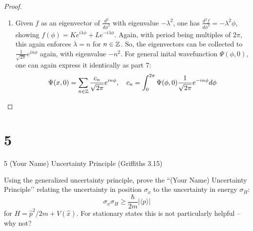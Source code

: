 \documentclass{article}
\begin{document}
\begin{proof}
\begin{enumerate}
        \item Given $f$ as an eigenvector of $\frac{d^2}{d\phi^2}$ with eigenvalue $-\lambda^2$, one has $\frac{d^2f}{d\phi^2}=-\lambda^2\phi$, showing $f(\phi) = Ke^{i\lambda\phi} + Le^{-i\lambda\phi}$. Again, with period being multiples of $2\pi$, this again enforces $\lambda = n$ for $n\in\mathbb{Z}$. So, the eigenvectors can be collected to $\frac{1}{\sqrt{2\pi}}e^{in\phi}$ again, with eigenvalue $-n^2$. For general inital wavefunction $\Psi(\phi,0)$, one can again express it identically as part 7:
        \begin{align}
            \Psi(x,0) = \sum_{n\in\mathbb{Z}}\frac{c_n}{\sqrt{2\pi}}e^{in\phi}, \quad c_n = \int_{0}^{2\pi}\Psi(\phi,0)\frac{1}{\sqrt{2\pi}}e^{-in\phi}d\phi
        \end{align}
    \end{enumerate}
\end{proof}

\newpage

\section*{5}
\begin{ques}\label{q5}
5 (Your Name) Uncertainty Principle (Griffiths 3.15)

Using the generalized uncertainty principle, prove the “(Your Name) Uncertainty Principle’’ relating the uncertainty in position $\sigma_x$ to the uncertainty in energy $\sigma_H$:
\[
\sigma_x \sigma_H \ge \frac{\hbar}{2m} |\langle p\rangle|
\]
for $H = \hat{p}^2/2m + V(\hat{x})$. For stationary states this is not particularly helpful – why not?
\end{ques}
\end{document}
